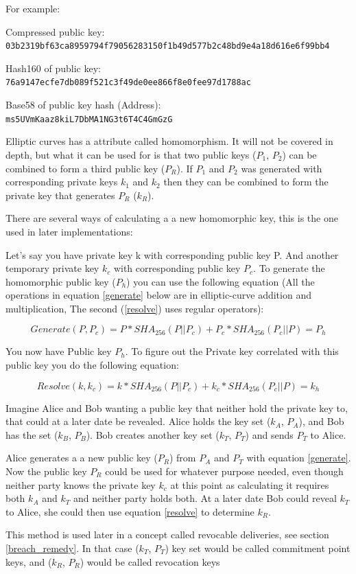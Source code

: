 For example:

Compressed public key:\\
\texttt{03b2319bf63ca8959794f79056283150f1b49d577b2c48bd9e4a18d616e6f99bb4}

Hash160 of public key:\\
\texttt{76a9147ecfe7db089f521c3f49de0ee866f8e0fee97d1788ac}

Base58 of public key hash (Address):\\
\texttt{ms5UVmKaaz8kiL7DbMA1NG3t6T4C4GmGzG}

\label{homomorphism}
Elliptic curves has a attribute called homomorphism. It will not be covered in depth, but what it can be used for is that two public keys ($P_1$, $P_2$) can be combined to form a third public key ($P_R$). If $P_1$ and $P_2$ was generated with corresponding private keys $k_1$ and $k_2$ then they can be combined to form the private key that generates $P_R$ ($k_R$).

There are several ways of calculating a a new homomorphic key, this is the one used in later implementations:

Let's say you have private key k with corresponding public key P. And another temporary private key $k_c$ with corresponding public key $P_c$. To generate the homomorphic public key ($P_h$) you can use the following equation (All the operations in equation \ref{generate} below are in elliptic-curve addition and multiplication, The second (\ref{resolve}) uses regular operators):

\begin{equation}\label{generate}
Generate(P, P_c) = P * SHA_{256}(P || P_c) + P_c * SHA_{256}(P_c || P) = P_h
\end{equation}

You now have Public key $P_h$. To figure out the Private key correlated with this public key you do the following equation:

\begin{equation}\label{resolve}
Resolve(k, k_c) = k * SHA_{256}(P || P_c) + k_c * SHA_{256}(P_c || P) = k_h
\end{equation}

Imagine Alice and Bob wanting a public key that neither hold the private key to, that could at a later date be revealed. Alice holds the key set ($k_A$, $P_A$), and Bob has the set ($k_B$, $P_B$). Bob creates another key set ($k_T$, $P_T$) and sends $P_T$ to Alice.

Alice generates a a new public key ($P_R$) from $P_A$ and $P_T$ with equation \ref{generate}. Now the public key $P_R$ could be used for whatever purpose needed, even though neither party knows the private key $k_c$ at this point as calculating it requires both $k_A$ and $k_T$ and neither party holds both. At a later date Bob could reveal $k_T$ to Alice, she could then use equation \ref{resolve} to determine $k_R$. 

This method is used later in a concept called revocable deliveries, see section \ref{breach_remedy}. In that case ($k_T$, $P_T$) key set would be called commitment point keys, and ($k_R$, $P_R$) would be called revocation keys